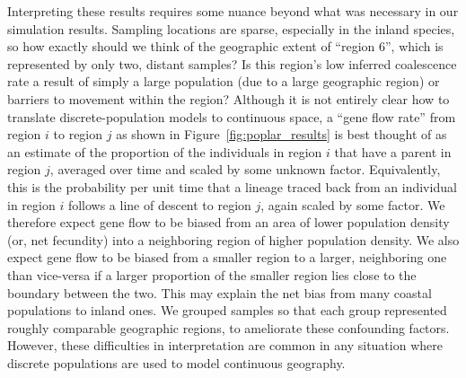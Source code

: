\documentclass{article}
\begin{document}
Interpreting these results requires some nuance beyond what was necessary in our simulation results.
Sampling locations are sparse, especially in the inland species,
so how exactly should we think of the geographic extent of ``region 6'',
which is represented by only two, distant samples?
Is this region's low inferred coalescence rate
a result of simply a large population (due to a large geographic region)
or barriers to movement within the region?
Although it is not entirely clear how to translate discrete-population models
to continuous space, 
a ``gene flow rate'' from region $i$ to region $j$ as shown in Figure~\ref{fig:poplar_results}
is best thought of as an estimate of the proportion of the individuals in region $i$
that have a parent in region $j$, averaged over time and scaled by some unknown factor.
Equivalently,
this is the probability per unit time
that a lineage traced back from an individual in region $i$ follows a line of descent to region $j$,
again scaled by some factor.
We therefore expect gene flow to be biased from an area of 
lower population density (or, net fecundity)
into a neighboring region of higher population density.
We also expect gene flow to be biased 
from a smaller region to a larger, neighboring one than vice-versa
if a larger proportion of the smaller region lies close to the boundary between the two.
This may explain the net bias from many coastal populations to inland ones.
We grouped samples so that each group represented roughly comparable geographic regions,
to ameliorate these confounding factors. 
However, these difficulties in interpretation are common in any situation
where discrete populations are used to model continuous geography.
\end{document}
